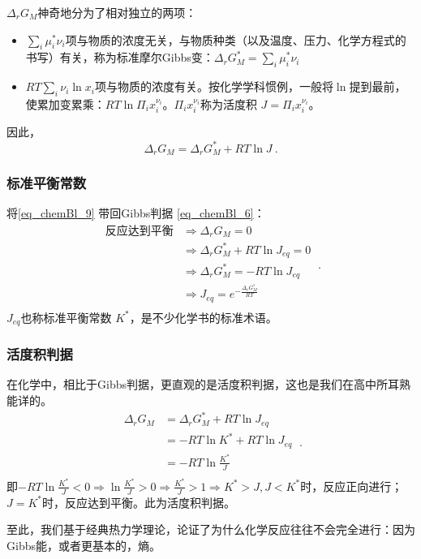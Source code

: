 $\Delta_r G_M$神奇地分为了相对独立的两项：
\begin{itemize}
\item $\sum_i \mu_i^* \nu_i$项与物质的浓度无关，与物质种类（以及温度、压力、化学方程式的书写）有关，称为标准摩尔Gibbs变：$\Delta_r G_M^* = \sum_i \mu_i^* \nu_i$
\item $RT \sum_i \nu_i \ln x_i$项与物质的浓度有关。按化学学科惯例，一般将$\ln$提到最前，使累加变累乘：$RT \ln \Pi_i x_i^{\nu_i}$。$\Pi_i x_i^{\nu_i}$称为活度积 $J=\Pi_i x_i^{\nu_i}$。
\end{itemize}
因此，\begin{equation} \label{eq_chemBl_9}
\Delta_r G_M = \Delta_r G_M^* + RT \ln J~.
\end{equation}

\subsubsection{标准平衡常数}
将\autoref{eq_chemBl_9} 带回Gibbs判据 \autoref{eq_chemBl_6}：
\begin{equation}
\begin{aligned}
\text{反应达到平衡} &\Rightarrow \Delta_r G_M = 0\\
&\Rightarrow \Delta_r G_M^* + RT \ln J_{eq} = 0\\
&\Rightarrow \Delta_r G_M^* = - RT \ln J_{eq}\\
&\Rightarrow J_{eq} = e^{-\frac{\Delta_r G_M^*}{RT}}\\
\end{aligned}~.
\end{equation}
$J_{eq}$也称标准平衡常数 $K^*$，是不少化学书的标准术语。

\subsubsection{活度积判据}
在化学中，相比于Gibbs判据，更直观的是活度积判据，这也是我们在高中所耳熟能详的。
$$
\begin{aligned}
\Delta_r G_M & = \Delta_r G_M^* + RT \ln J_{eq}\\
& = - RT \ln K^* + RT \ln J_{eq}\\
& = - RT \ln \frac{K^*}{J} \\
\end{aligned}~.
$$
即$- RT \ln \frac{K^*}{J}<0 \Rightarrow \ln \frac{K^*}{J} >0 \Rightarrow \frac{K^*}{J} >1 \Rightarrow K^*>J, J<K^*$时，反应正向进行；$J=K^*$时，反应达到平衡。此为活度积判据。

至此，我们基于经典热力学理论，论证了为什么化学反应往往不会完全进行：因为Gibbs能，或者更基本的，熵。


